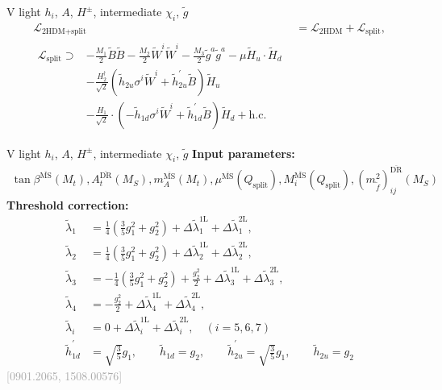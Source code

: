 \documentclass[hyperref={pdfpagelabels=false},ngerman]{beamer}
\newcommand{\MS}{\ensuremath{M_S}}
\newcommand{\bigcite}[1]{\textcolor{darkgray}{[#1]}}
\renewcommand{\emph}{\textbf}
\newcommand{\DRbar}{\ensuremath{\overline{\text{DR}}}}
\newcommand{\MSbar}{\ensuremath{\overline{\text{MS}}}}
\newcommand{\SplitTHDM}{\ensuremath{\text{2HDM+split}}\xspace}
\newcommand{\THDM}{\ensuremath{\text{2HDM}}\xspace}
\newcommand{\hc}{\ensuremath{\text{h.c.}}}
\newcommand{\Qsplit}{\ensuremath{Q_\text{split}}\xspace}
\newcommand{\Lag}{\ensuremath{\mathcal{L}}}
\newcommand{\DlSplitTHDM}[2]{\Delta\tilde\lambda_{#1}^{\text{#2L}}}
\newcommand{\gSplitTHDM}[1]{\ensuremath{\tilde{h}_{#1}}}
\newcommand{\gpSplitTHDM}[1]{\ensuremath{\tilde{h}_{#1}^{\prime}}}
\begin{document}
\begin{frame}{V light $h_i$, $A$, $H^{\pm}$, intermediate $\chi_i$, $\tilde{g}$}
\begin{align*}
  \Lag_{\SplitTHDM} &= \Lag_{\THDM} + \Lag_\text{split}, \\
\begin{split}
  \Lag_\text{split} \supset
  &- \frac{M_1}{2} \tilde{B}\tilde{B}
  - \frac{M_2}{2} \tilde{W}^i\tilde{W}^i
  - \frac{M_3}{2} \tilde{g}^a\tilde{g}^a
  - \mu \tilde{H}_u\cdot \tilde{H}_d \\
  &-\frac{H_2^\dagger}{\sqrt{2}} \left( \gSplitTHDM{2u} \sigma^i\tilde{W}^i
     +\gpSplitTHDM{2u} \tilde{B} \right)\tilde{H}_u \\
  &-\frac{H_1}{\sqrt{2}} \cdot  \left( -\gSplitTHDM{1d} \sigma^i\tilde{W}^i
     + \gpSplitTHDM{1d} \tilde{B} \right) \tilde{H}_d
  + \hc
\end{split}
\end{align*}
\end{frame}

\begin{frame}{V light $h_i$, $A$, $H^{\pm}$, intermediate $\chi_i$, $\tilde{g}$}
  \emph{Input parameters:}
  \begin{align*}
  \tan\beta^{\MSbar}(M_t), A_t^{\DRbar}(\MS), m_A^{\MSbar}(M_t),
  \mu^{\MSbar}(\Qsplit), M_i^{\MSbar}(\Qsplit),
  (m_{\tilde{f}}^2)^{\DRbar}_{ij}(\MS)
  \end{align*}
  \emph{Threshold correction:}
  \begin{align*}
    \tilde\lambda_1 &= \frac{1}{4}\left(\frac{3}{5} g_1^2 + g_2^2\right) + \DlSplitTHDM{1}{1} + \DlSplitTHDM{1}{2},\\
    \tilde\lambda_2 &= \frac{1}{4}\left(\frac{3}{5} g_1^2 + g_2^2\right) + \DlSplitTHDM{2}{1} + \DlSplitTHDM{2}{2},\\
    \tilde\lambda_3 &= -\frac{1}{4} \left(\frac{3}{5}g_1^2 + g_2^2\right) + \frac{g_2^2}{2} + \DlSplitTHDM{3}{1} + \DlSplitTHDM{3}{2},\\
    \tilde\lambda_4 &= -\frac{g_2^2}{2} + \DlSplitTHDM{4}{1} + \DlSplitTHDM{4}{2},\\
    \tilde\lambda_i &= 0 + \DlSplitTHDM{i}{1} + \DlSplitTHDM{i}{2}, \quad (i = 5,6,7)\\
    \gpSplitTHDM{1d} &= \sqrt{\frac{3}{5}} g_1, \qquad
    \gSplitTHDM{1d}  = g_2, \qquad
    \gpSplitTHDM{2u} = \sqrt{\frac{3}{5}} g_1, \qquad
    \gSplitTHDM{2u}  = g_2
  \end{align*}
  \hfill\bigcite{0901.2065, 1508.00576}
\end{frame}
\end{document}
